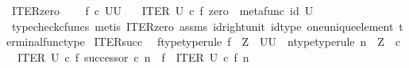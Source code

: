 \begin{isabellebody}
\isamarkupfalse%
%
\endisatagproof
{\isafoldproof}%
%
\isadelimproof
\isanewline
%
\endisadelimproof
\isanewline
{}\isamarkupfalse%
\ ITER{\isacharunderscore}{\kern0pt}zero{\isacharprime}{\kern0pt}{\isacharcolon}{\kern0pt}\ \isanewline
\ \ \ {\isachardoublequoteopen}f\ {\isasymin}\isactrlsub c\ {\isacharparenleft}{\kern0pt}U\isactrlbsup U\isactrlesup {\isacharparenright}{\kern0pt}{\isachardoublequoteclose}\isanewline
\ \ \ {\isachardoublequoteopen}ITER\ U\ {\isasymcirc}\isactrlsub c\ {\isasymlangle}f{\isacharcomma}{\kern0pt}\ zero{\isasymrangle}\ {\isacharequal}{\kern0pt}\ metafunc\ {\isacharparenleft}{\kern0pt}id\ U{\isacharparenright}{\kern0pt}{\isachardoublequoteclose}\isanewline
%
\isadelimproof
\ \ %
\endisadelimproof
%
\isatagproof
{}\isamarkupfalse%
\ {\isacharparenleft}{\kern0pt}typecheck{\isacharunderscore}{\kern0pt}cfuncs{\isacharcomma}{\kern0pt}\ metis\ ITER{\isacharunderscore}{\kern0pt}zero\ assms\ id{\isacharunderscore}{\kern0pt}right{\isacharunderscore}{\kern0pt}unit{}\ id{\isacharunderscore}{\kern0pt}type\ one{\isacharunderscore}{\kern0pt}unique{\isacharunderscore}{\kern0pt}element\ terminal{\isacharunderscore}{\kern0pt}func{\isacharunderscore}{\kern0pt}type{\isacharparenright}{\kern0pt}%
\endisatagproof
{\isafoldproof}%
%
\isadelimproof
\isanewline
%
\endisadelimproof
\isanewline
{}\isamarkupfalse%
\ ITER{\isacharunderscore}{\kern0pt}succ{\isacharcolon}{\kern0pt}\isanewline
\ \ f{\isacharunderscore}{\kern0pt}type{\isacharbrackleft}{\kern0pt}type{\isacharunderscore}{\kern0pt}rule{\isacharbrackright}{\kern0pt}{\isacharcolon}{\kern0pt}\ {\isachardoublequoteopen}f\ {\isacharcolon}{\kern0pt}\ Z\ {\isasymrightarrow}\ {\isacharparenleft}{\kern0pt}U\isactrlbsup U\isactrlesup {\isacharparenright}{\kern0pt}{\isachardoublequoteclose}\ \ n{\isacharunderscore}{\kern0pt}type{\isacharbrackleft}{\kern0pt}type{\isacharunderscore}{\kern0pt}rule{\isacharbrackright}{\kern0pt}{\isacharcolon}{\kern0pt}\ {\isachardoublequoteopen}n\ {\isacharcolon}{\kern0pt}\ Z\ {\isasymrightarrow}\ {\isasymnat}\isactrlsub c{\isachardoublequoteclose}\isanewline
\ \ {\isachardoublequoteopen}ITER\ U\ {\isasymcirc}\isactrlsub c\ {\isasymlangle}f{\isacharcomma}{\kern0pt}\ successor\ {\isasymcirc}\isactrlsub c\ n{\isasymrangle}\ {\isacharequal}{\kern0pt}\ f\ {\isasymbox}\ {\isacharparenleft}{\kern0pt}ITER\ U\ {\isasymcirc}\isactrlsub c\ {\isasymlangle}f{\isacharcomma}{\kern0pt}\ n\ {\isasymrangle}{\isacharparenright}{\kern0pt}{\isachardoublequoteclose}\isanewline

\end{isabellebody}
